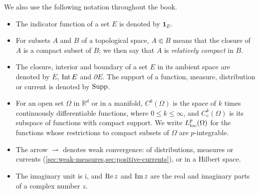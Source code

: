 We also use the following notation throughout the book.
\begin{itemize}
    \item The indicator function of a set $E$ is denoted by $\mathbf1_E$.
    \item For subsets $A$ and $B$ of a topological space, $A\Subset B$ means that the closure of $A$ is a compact subset of $B$; we then say that $A$ is \emph{relatively compact} in $B$.
    \item The closure, interior and boundary of a set $E$ in its ambient space are denoted by $\overline E$, $\operatorname{Int} E$ and $\partial E$. The support of a function, measure, distribution or current is denoted by $\operatorname{Supp}$.
    \item For an open set $\Omega$ in $\mathbb R^d$ or in a manifold, $C^k(\Omega)$ is the space of $k$ times continuously differentiable functions, where $0\leq k\leq\infty$, and $C^k_c(\Omega)$ is its subspace of functions with compact support. We write $L^p_{\mathrm{loc}}(\Omega)$ for the functions whose restrictions to compact subsets of $\Omega$ are $p$-integrable.
    \item The arrow $\rightharpoonup$ denotes weak convergence: of distributions, measures or currents (\cref{sec:weak-measures,sec:positive-currents}), or in a Hilbert space.
    \item The imaginary unit is $\mathrm{i}$, and $\operatorname{Re} z$ and $\operatorname{Im} z$ are the real and imaginary parts of a complex number $z$.
\end{itemize}
